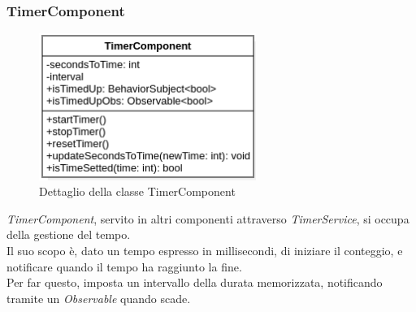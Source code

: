 \subsubsection{TimerComponent}
\begin{figure}[h]
    \centering
    \includegraphics[width=200pt]{images/prog/TimerComponent.png}
    \caption{Dettaglio della classe TimerComponent}
    \label{fig:timer}
\end{figure}
\emph{TimerComponent}, servito in altri componenti attraverso \emph{TimerService}, si occupa della gestione del tempo.\\ 
Il suo scopo è, dato un tempo espresso in millisecondi, di iniziare il conteggio, e notificare quando il tempo ha raggiunto la fine.\\
Per far questo, imposta un intervallo della durata memorizzata, notificando tramite un \emph{Observable} quando scade.
